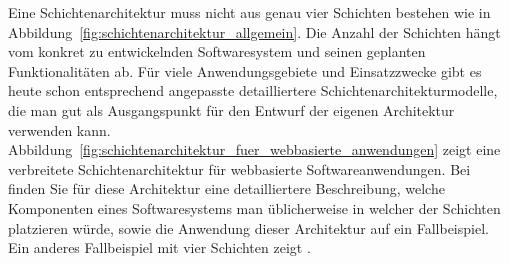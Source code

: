 Eine Schichtenarchitektur muss nicht aus genau vier Schichten bestehen wie in \mbox{Abbildung}~\ref{fig:schichtenarchitektur_allgemein}. Die Anzahl der Schichten hängt vom konkret zu entwickelnden Software\-system und seinen geplanten Funktionalitäten ab. Für viele Anwendungs\-gebiete und Einsatzzwecke gibt es heute schon entsprechend angepasste detailliertere Schichtenarchitekturmodelle, die man gut als Ausgangspunkt für den Entwurf der eigenen Architektur verwenden kann. Abbildung~\ref{fig:schichtenarchitektur_fuer_webbasierte_anwendungen} zeigt eine verbreitete Schichtenarchitektur für webbasierte Softwareanwendungen. Bei \cite[108-113]{som20} finden Sie für diese Architektur eine detailliertere Beschreibung, welche Komponenten eines Softwaresystems man üblicherweise in welcher der Schichten platzieren würde, sowie die Anwendung dieser Architektur auf ein Fallbeispiel. Ein anderes Fallbeispiel mit vier Schichten zeigt \cite[214\psq]{som18}.